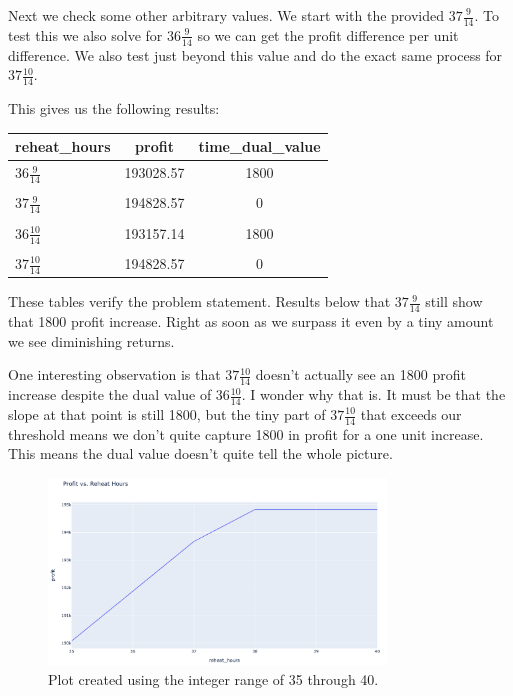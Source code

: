 Next we check some other arbitrary values. We start with the provided $37 \frac{9}{14}$. To test this we also solve for $36 \frac{9}{14}$ so we can get the profit difference per unit difference. We also test just beyond this value and do the exact same process for $37 \frac{10}{14}$. 

This gives us the following results:

\begin{table}[!ht]
    \centering
    \begin{tabular}{lcc}
    \hline
        reheat\_hours & profit & time\_dual\_value \\ \hline
	$36 \frac{9}{14}$ & 193028.57 & 1800 \\\\ 
	$37 \frac{9}{14}$ & 194828.57 & 0 \\\\
    $36 \frac{10}{14}$ & 193157.14 & 1800 \\\\
	$37 \frac{10}{14}$ & 194828.57 & 0 \\
    \end{tabular}
\end{table}

These tables verify the problem statement. Results below that $37 \frac{9}{14}$ still show that 1800 profit increase. Right as soon as we surpass it even by a tiny amount we see diminishing returns.

One interesting observation is that $37 \frac{10}{14}$ doesn't actually see an 1800 profit increase despite the dual value of $36 \frac{10}{14}$. I wonder why that is. It must be that the slope at that point is still 1800, but the tiny part of $37 \frac{10}{14}$ that exceeds our threshold means we don't quite capture 1800 in profit for a one unit increase. This means the dual value doesn't quite tell the whole picture. 

\begin{figure}[htbp]
    \centering
    \includegraphics[width=0.8\textwidth]{../images/profit-vs-reheat-1.png}
    \caption{Plot created using the integer range of 35 through 40.}
    \label{fig:your_label}
\end{figure}

